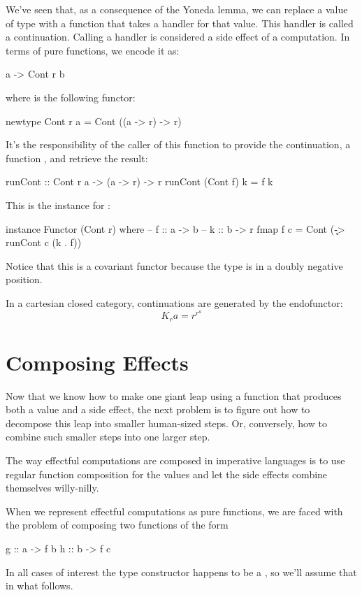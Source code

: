 \documentclass[DaoFP]{subfiles}
\begin{document}
We've seen that, as a consequence of the Yoneda lemma, we can replace a value of type  with a function that takes a handler for that value. This handler is called a continuation. Calling a handler is considered a side effect of a computation. In terms of pure functions, we encode it as:
\begin{haskell}
a -> Cont r b
\end{haskell}
where  is the following functor:
\begin{haskell}
newtype Cont r a = Cont ((a -> r) -> r)
\end{haskell}
It's the responsibility of the caller of this function to provide the continuation, a function , and retrieve the result:
\begin{haskell}
runCont :: Cont r a -> (a -> r) -> r
runCont (Cont f) k = f k
\end{haskell}

This is the  instance for :
\begin{haskell}
instance Functor (Cont r) where
  -- f :: a -> b
  -- k :: b -> r
  fmap f c = Cont (\k -> runCont c (k . f))
\end{haskell}
Notice that this is a covariant functor because the type  is in a doubly negative position.

In a cartesian closed category, continuations are generated by the endofunctor:
\[ K_r a = r^{r^a} \]

\section{Composing Effects}

Now that we know how to make one giant leap using a function that produces both a value and a side effect, the next problem is to figure out how to decompose this leap into smaller human-sized steps. Or, conversely, how to combine such smaller steps into one larger step. 

The way effectful computations are composed in imperative languages is to use regular function composition for the values and let the side effects combine themselves willy-nilly. 

When we represent effectful computations as pure functions, we are faced with the problem of composing two functions of the form
\begin{haskell}
g :: a -> f b
h :: b -> f c
\end{haskell}
In all cases of interest the type constructor  happens to be a , so we'll assume that in what follows.
\end{document}
